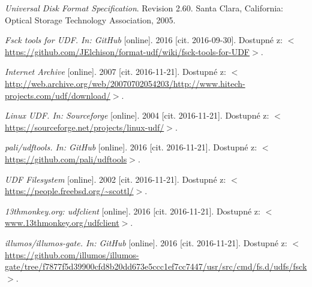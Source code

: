 \begin{literatura}{99}
	
    \emph{Universal Disk Format Specification}. Revision 2.60. Santa Clara, California: Optical Storage Technology Association, 2005.

    \emph{Fsck tools for UDF. In: GitHub}\/ [online]. 2016 [cit. 2016-09-30]. Dostupné z: \(<\)\url{https://github.com/JElchison/format-udf/wiki/fsck-tools-for-UDF}\(>\).  

    \emph{Internet Archive}\/ [online]. 2007 [cit. 2016-11-21]. Dostupné z: \(<\)\url{http://web.archive.org/web/20070702054203/http://www.hitech-projects.com/udf/download/}\(>\).  

    \emph{Linux UDF. In: Sourceforge}\/ [online]. 2004 [cit. 2016-11-21]. Dostupné z: \(<\)\url{https://sourceforge.net/projects/linux-udf/}\(>\).  

    \emph{pali/udftools. In: GitHub}\/ [online]. 2016 [cit. 2016-11-21]. Dostupné z: \(<\)\url{https://github.com/pali/udftools}\(>\).  

    \emph{UDF Filesystem}\/ [online]. 2002 [cit. 2016-11-21]. Dostupné z: \(<\)\url{https://people.freebsd.org/~scottl/}\(>\).  

    \emph{13thmonkey.org: udfclient}\/ [online]. 2016 [cit. 2016-11-21]. Dostupné z: \(<\)\url{www.13thmonkey.org/udfclient}\(>\).  

    \emph{illumos/illumos-gate. In: GitHub}\/ [online]. 2016 [cit. 2016-11-21]. Dostupné z: \(<\)\url{https://github.com/illumos/illumos-gate/tree/f7877f5d39900cfd8b20dd673e5ccc1ef7cc7447/usr/src/cmd/fs.d/udfs/fsck}\(>\).  


\end{literatura}
